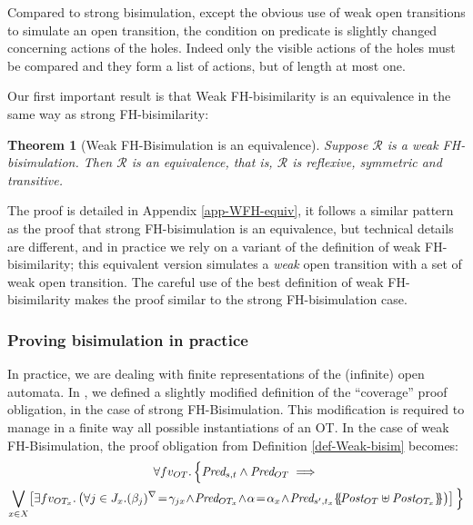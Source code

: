\documentclass{lmcs}
\newtheorem{theorem}{Theorem}
\begin{document}
Compared to strong bisimulation, except the obvious use of weak open transitions to simulate an open transition, the condition on predicate is slightly changed concerning actions of the holes. Indeed only the visible actions of the holes must be compared and they form a list of actions, but of length at most one.




Our first important result is that Weak FH-bisimilarity is an equivalence in the same way as strong FH-bisimilarity:


\begin{theorem}[Weak FH-Bisimulation is an equivalence]\label{thm-weak-equiv} Suppose $\mathcal{R}$ 
is a weak FH-bisimulation. Then $\mathcal{R}$ is an equivalence, that is, $\mathcal{R}$ is 
reflexive, symmetric and transitive.
\end{theorem}
The proof  is detailed in Appendix \ref{app-WFH-equiv}, it follows a similar pattern as the proof that strong FH-bisimulation is an equivalence, but technical details are different, and in practice we rely on a variant of the definition of weak FH-bisimilarity; this equivalent version simulates a \emph{weak} open transition with a set of weak open transition. The careful use of the best definition of weak FH-bisimilarity makes the proof similar to the strong FH-bisimulation case.

\subsubsection*{Proving bisimulation in practice}

In practice, we are dealing with finite representations of the (infinite) open automata. In \cite{hou:hal-02406098}, we defined a slightly modified definition of the ``coverage'' proof obligation, in the case of strong FH-Bisimulation. This modification is required to manage in a finite way all possible instantiations of an OT. In the case of weak FH-Bisimulation, the proof obligation from Definition \ref{def-Weak-bisim} becomes:
      \begin{multline*}
\forall fv_{OT}.\, \Big\{ \Pred_{s,t} \land \Pred_{OT} \implies\\
 \bigvee_{x\in X}\!
  \left[\exists fv_{OT_x}.
    \left( \forall j\in J_x. \vis{\beta_j}\!=\!\gamma_{jx}\! \land\! \Pred_{OT_x}
     \!\land\! \alpha\!=\!\alpha_x\! \land\!  
     \Pred_{s',t_x}\subst{\Post_{OT}\uplus\Post_{OT_x}}\right)\right]\Big\}
\end{multline*}
\end{document}
